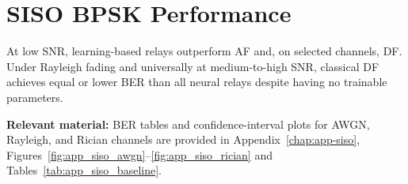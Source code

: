 \section{SISO BPSK Performance}
\label{sec:siso-bpsk}

At low SNR, learning-based relays outperform AF and, on selected channels, DF.
Under Rayleigh fading and universally at medium-to-high SNR, classical DF achieves equal or lower BER than all neural relays despite having no trainable parameters.

\textbf{Relevant material:}
BER tables and confidence-interval plots for AWGN, Rayleigh, and Rician channels
are provided in Appendix~\ref{chap:app-siso},
Figures~\ref{fig:app_siso_awgn}--\ref{fig:app_siso_rician}
and Tables~\ref{tab:app_siso_baseline}.
